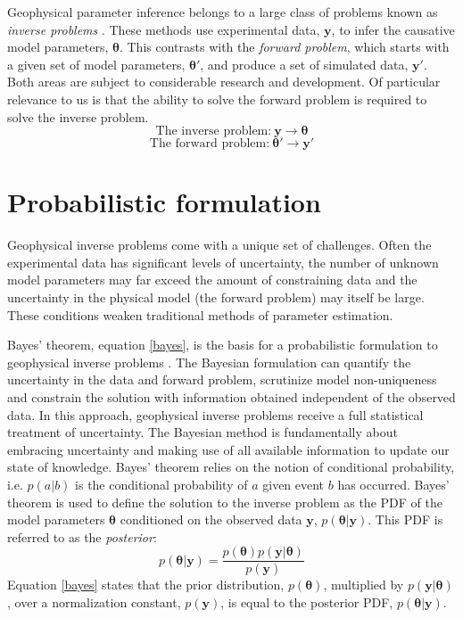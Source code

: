 Geophysical parameter inference belongs to a large class of problems known as \textit{inverse problems} \citep{Tarantola2005,Aster2013,Menke2012}. These methods use experimental data, $\bm{y}$, to infer the causative model parameters, $\bm{\theta}$. This contrasts with the \textit{forward problem}, which starts with a given set of model parameters, $\bm{\theta'}$, and produce a set of simulated data, $\bm{y'}$. Both areas are subject to considerable research and development. Of particular relevance to us is that the ability to solve the forward problem is required to solve the inverse problem.
\begin{equation}
\text{The inverse problem:}\ \bm{y} \rightarrow \bm{\theta}
\label{inverse_problem}
\end{equation}
\begin{equation}
\text{The forward problem:}\ \bm{\theta'} \rightarrow \bm{y'}
\label{forward_problem}
\end{equation}


\section{Probabilistic formulation}

Geophysical inverse problems come with a unique set of challenges. Often the experimental data has significant levels of uncertainty, the number of unknown model parameters may far exceed the amount of constraining data and the uncertainty in the physical model (the forward problem) may itself be large. These conditions weaken  traditional methods of parameter estimation.\par

Bayes' theorem, equation \ref{bayes}, is the basis for a probabilistic formulation to geophysical inverse problems \citep{Tarantola1982a,Mosegaard1995,Mosegaard2002,Tarantola2005}. The Bayesian formulation can quantify the uncertainty in the data and forward problem, scrutinize model non-uniqueness and constrain the solution with information obtained independent of the observed data. In this approach, geophysical inverse problems receive a full statistical treatment of uncertainty. The Bayesian method is fundamentally about embracing uncertainty and making use of all available information to update our state of knowledge. Bayes' theorem relies on the notion of conditional probability, i.e. $p(a|b)$ is the conditional probability of $a$ given event $b$ has occurred. Bayes' theorem is used to define the solution to the inverse problem as the PDF of the model parameters $\bm{\theta}$ conditioned on the observed data $\bm{y}$, $p(\bm{\theta}|\bm{y})$. This PDF is referred to as the \textit{posterior}:
\begin{equation}
p(\bm{\theta}|\bm{y}) = \frac{p(\bm{\theta}) p(\bm{y}|\bm{\theta})}{p(\bm{y})}
\label{bayes}
\end{equation}
Equation \ref{bayes} states that the prior distribution, $p(\bm{\theta})$, multiplied by $p(\bm{y}|\bm{\theta})$, over a normalization constant, $p(\bm{y})$, is equal to the posterior PDF, $p(\bm{\theta}|\bm{y})$.\par


